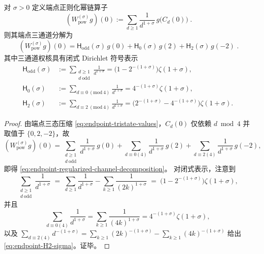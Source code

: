 \begin{proposition}\label{prop:endpoint-dirichlet-symbol-weights}
对 \(\sigma>0\) 定义端点正则化幂链算子
\begin{equation}\label{eq:endpoint-regularized-channel-operator}
\boxed{\;
(W_{\mathrm{pow}}^{(\sigma)}g)(0)
:=\sum_{d\ge 1}\frac{1}{d^{1+\sigma}}\,g\!\bigl(C_d(0)\bigr)\; }.
\end{equation}
则其端点三通道分解为
\begin{equation}\label{eq:endpoint-regularized-channel-decomposition}
\boxed{\;
(W_{\mathrm{pow}}^{(\sigma)}g)(0)
=\mathsf H_{\mathrm{odd}}(\sigma)\,g(0)
+\mathsf H_{0}(\sigma)\,g(2)
+\mathsf H_{2}(\sigma)\,g(-2)\; }.
\end{equation}
其中三通道权核具有闭式 Dirichlet 符号表示
\begin{align}
\mathsf H_{\mathrm{odd}}(\sigma)
&:=\sum_{\substack{d\ge 1\\ d\ \mathrm{odd}}}\frac{1}{d^{1+\sigma}}
=\bigl(1-2^{-(1+\sigma)}\bigr)\zeta(1+\sigma),\label{eq:endpoint-Hodd-sigma}\\
\mathsf H_{0}(\sigma)
&:=\sum_{d\equiv 0\ (\mathrm{mod}\ 4)}\frac{1}{d^{1+\sigma}}
=4^{-(1+\sigma)}\zeta(1+\sigma),\label{eq:endpoint-H0-sigma}\\
\mathsf H_{2}(\sigma)
&:=\sum_{d\equiv 2\ (\mathrm{mod}\ 4)}\frac{1}{d^{1+\sigma}}
=\bigl(2^{-(1+\sigma)}-4^{-(1+\sigma)}\bigr)\zeta(1+\sigma).\label{eq:endpoint-H2-sigma}
\end{align}
\end{proposition}
\begin{proof}
由端点三态压缩 \eqref{eq:endpoint-tristate-values}，\(C_d(0)\) 仅依赖 \(d\bmod 4\) 并取值于 \(\{0,2,-2\}\)，故
\[
(W_{\mathrm{pow}}^{(\sigma)}g)(0)
=\sum_{\substack{d\ge 1\\ d\ \mathrm{odd}}}\frac{1}{d^{1+\sigma}}\,g(0)
+\sum_{d\equiv 0(4)}\frac{1}{d^{1+\sigma}}\,g(2)
+\sum_{d\equiv 2(4)}\frac{1}{d^{1+\sigma}}\,g(-2),
\]
即得 \eqref{eq:endpoint-regularized-channel-decomposition}。
对闭式表示，注意到
\[
\sum_{\substack{d\ge 1\\ d\ \mathrm{odd}}}\frac{1}{d^{1+\sigma}}
\;=\;\sum_{d\ge 1}\frac{1}{d^{1+\sigma}}-\sum_{k\ge 1}\frac{1}{(2k)^{1+\sigma}}
\;=\;\bigl(1-2^{-(1+\sigma)}\bigr)\zeta(1+\sigma),
\]
并且
\[
\sum_{d\equiv 0(4)}\frac{1}{d^{1+\sigma}}
=\sum_{k\ge 1}\frac{1}{(4k)^{1+\sigma}}
=4^{-(1+\sigma)}\zeta(1+\sigma),
\]
以及
\(
\sum_{d\equiv 2(4)}d^{-(1+\sigma)}
=\sum_{k\ge 1}(2k)^{-(1+\sigma)}-\sum_{k\ge 1}(4k)^{-(1+\sigma)}
\)
给出 \eqref{eq:endpoint-H2-sigma}。证毕。
\end{proof}

